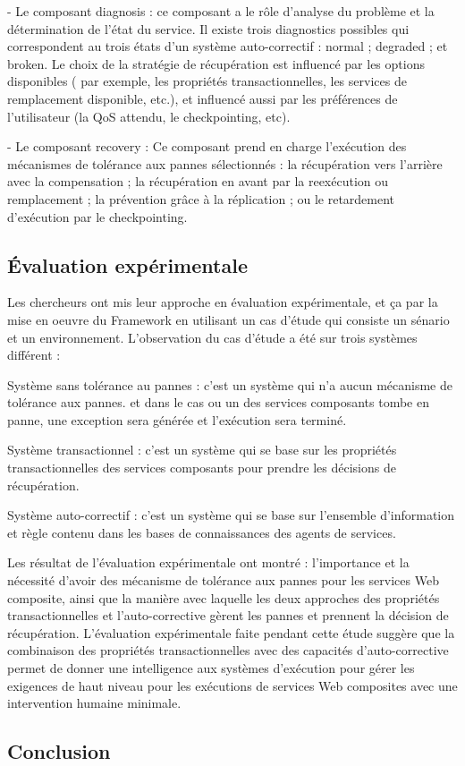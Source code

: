- Le composant diagnosis : ce composant a le rôle d'analyse du problème et la détermination de l'état du service.
Il existe trois diagnostics possibles qui correspondent au trois états d'un système auto-correctif : normal ; degraded ; et broken. Le choix de la stratégie de récupération est influencé par les options disponibles ( par exemple, les propriétés transactionnelles, les services de remplacement disponible, etc.), et influencé aussi par les préférences de l'utilisateur (la QoS attendu, le checkpointing, etc).

- Le composant recovery :  Ce composant prend en charge l'exécution des mécanismes de tolérance aux pannes sélectionnés : la récupération vers l'arrière avec la compensation ; la récupération en avant par la reexécution ou remplacement ; la prévention grâce à la réplication ; ou le retardement d'exécution par le checkpointing.



\subsection{Évaluation expérimentale }

Les chercheurs ont mis leur approche en évaluation expérimentale, et ça par la mise en oeuvre du Framework  en utilisant un cas d'étude qui consiste un sénario et un environnement.
L'observation du cas d'étude a été sur trois systèmes différent :

Système sans tolérance au pannes : c'est un système qui n'a aucun mécanisme de tolérance aux pannes. et dans le cas ou un des services composants tombe en panne, une exception sera générée et l'exécution sera terminé.

Système transactionnel : c'est un système qui se base sur les propriétés transactionnelles des services composants pour prendre les décisions de récupération.

Système auto-correctif :  c'est un système qui se base sur l'ensemble d'information et règle contenu dans les bases de connaissances des agents de services.


Les résultat de l'évaluation expérimentale ont montré : l'importance et la nécessité d'avoir des mécanisme de tolérance aux pannes pour les services Web composite, ainsi que la manière avec laquelle les deux approches des propriétés transactionnelles et l'auto-corrective gèrent les pannes et prennent la décision de récupération.
L'évaluation expérimentale faite pendant cette étude suggère que la combinaison des propriétés transactionnelles avec des capacités d'auto-corrective permet de donner une intelligence aux systèmes d'exécution pour gérer les exigences de haut niveau pour les exécutions de services Web composites avec une intervention humaine minimale\cite{1}.

\subsection{Conclusion}

